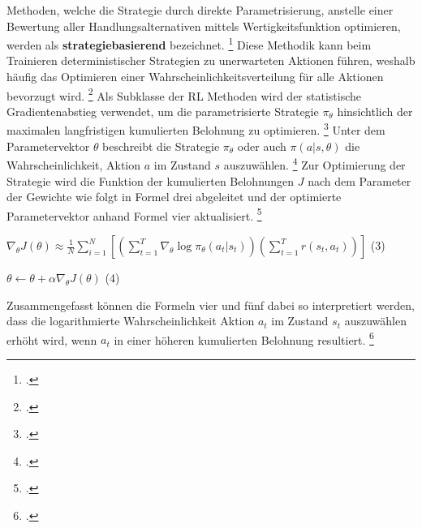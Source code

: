 Methoden, welche die Strategie durch direkte Parametrisierung, anstelle einer Bewertung aller Handlungsalternativen mittels Wertigkeitsfunktion optimieren, werden als \textbf{strategiebasierend} bezeichnet. \footcite[Vgl.][S. 2]{Zhang.2018}
Diese Methodik kann beim Trainieren deterministischer Strategien zu unerwarteten Aktionen führen, weshalb häufig das Optimieren einer Wahrscheinlichkeitsverteilung für alle Aktionen bevorzugt wird. \footcite[Vgl.][S. 3]{Ningombam.2022}
Als Subklasse der RL Methoden wird der statistische Gradientenabstieg verwendet, um die parametrisierte Strategie $\pi_{\theta}$ hinsichtlich der maximalen langfristigen kumulierten Belohnung zu optimieren. \footcite[Vgl.][S. 3]{Ningombam.2022}
Unter dem Parametervektor $\theta$ beschreibt die Strategie $\pi_{\theta}$ oder auch $\pi(a|s,\theta)$ die Wahrscheinlichkeit, Aktion $a$ im Zustand $s$ auszuwählen. \footcite[Vgl.][S. 321]{Sutton.2018}
Zur Optimierung der Strategie wird die Funktion der kumulierten Belohnungen $J$ nach dem Parameter der Gewichte wie folgt in Formel drei abgeleitet und der optimierte Parametervektor anhand Formel vier aktualisiert. \footcite[Vgl.][S. 6]{Wang.2020}
\begin{description}
    \item \begin{center} $\nabla_{\theta}J(\theta) \approx \frac{1}{N} \sum \limits_{i=1}^{N} \left[(\sum \limits_{t=1}^{T} \nabla_{\theta}\log\pi_{\theta}(a_{t}|s_{t}))(\sum \limits_{t=1}^{T} r(s_{t},a_{t}))\right]$ (3)\end{center}
    \item \begin{center} $\theta \leftarrow \theta + \alpha\nabla_{\theta}J(\theta)$ (4)\end{center}
\end{description}
Zusammengefasst können die Formeln vier und fünf dabei so interpretiert werden, dass die logarithmierte Wahrscheinlichkeit Aktion $a_{t}$ im Zustand $s_{t}$ auszuwählen erhöht wird, wenn $a_{t}$ in einer höheren kumulierten Belohnung resultiert. \footcite[Vgl.][S. 6]{Wang.2020}

